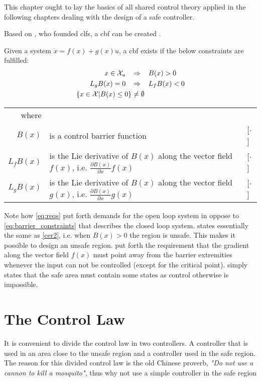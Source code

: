 This chapter ought to lay the basics of all shared control theory applied in the following chapters dealing with the design of a safe controller.

Based on \citep{bib:artstein}, who founded \glspl{clf}, a \gls{cbf} can be created \citep{bib:org_control}. 
\begin{exa}
Given a system $\dot{x}=f(x)+g(x)u$, a \gls{cbf} exists if the below constraints are fulfilled:
\begin{subequations}\label{eq:reqs}
\begin{flalign}
x\in \mathcal{X}_u \hspace{0.3cm} &\Rightarrow \hspace{0.3cm} B(x) > 0  \label{req1} \\
L_gB(x) = 0 \hspace{0.3cm} &\Rightarrow \hspace{0.3cm} L_fB(x) < 0 \label{req2} \\
\{ x \in \mathcal{X} | B(x) \leq 0 \} &\neq \emptyset \label{req3}
\end{flalign}
\end{subequations}
\vspace{-0.6cm}
\begin{tabular}{r l l} 
where  & & \\
$B(x)$ & is a control barrier function & [$\cdot$] \\ 
$L_fB(x)$ & is the Lie derivative of $B(x)$ along the vector field  $f(x)$, i.e. $\frac{\partial B(x)}{\partial x}f(x)$ & [$\cdot$] \\ 
$L_gB(x)$ & is the Lie derivative of $B(x)$ along the vector field  $g(x)$, i.e. $\frac{\partial B(x)}{\partial x}g(x)$ & [$\cdot$] 
\end{tabular}
\vspace*{0.2cm}
\end{exa}
Note how \autoref{eq:reqs} put forth demands for the open loop system in oppose to \autoref{eq:barrier_constraints} that describes the closed loop system.  states essentially the same as \autoref{cer2}, i.e. when $B(x)>0$ the region is unsafe. This makes it possible to design an unsafe region.  put forth the requirement that the gradient along the vector field $f(x)$ must point away from the barrier extremities whenever the input can not be controlled (except for the critical point).  simply states that the safe area must contain some states as control otherwise is impossible.
%
\section{The Control Law}\label{eq:control_for_safety}
It is convenient to divide the control law in two controllers. A controller that is used in an area close to the unsafe region and a controller used in the safe region. The reason for this divided control law is the old Chinese proverb, \textit{"Do not use a cannon to kill a mosquito"}, thus why not use a simple controller in the safe region


